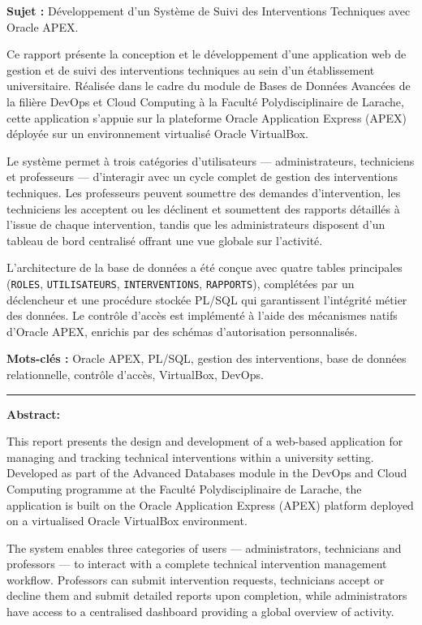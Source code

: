 \documentclass[12pt,a4paper,oneside]{report}
\begin{document}
\textbf{Sujet :} Développement d'un Système de Suivi des Interventions Techniques avec Oracle APEX.

\medskip
Ce rapport présente la conception et le développement d'une application web de gestion et de suivi des interventions techniques au sein d'un établissement universitaire. Réalisée dans le cadre du module de Bases de Données Avancées de la filière DevOps et Cloud Computing à la Faculté Polydisciplinaire de Larache, cette application s'appuie sur la plateforme Oracle Application Express (APEX) déployée sur un environnement virtualisé Oracle VirtualBox.

Le système permet à trois catégories d'utilisateurs — administrateurs, techniciens et professeurs — d'interagir avec un cycle complet de gestion des interventions techniques. Les professeurs peuvent soumettre des demandes d'intervention, les techniciens les acceptent ou les déclinent et soumettent des rapports détaillés à l'issue de chaque intervention, tandis que les administrateurs disposent d'un tableau de bord centralisé offrant une vue globale sur l'activité.

L'architecture de la base de données a été conçue avec quatre tables principales (\texttt{ROLES}, \texttt{UTILISATEURS}, \texttt{INTERVENTIONS}, \texttt{RAPPORTS}), complétées par un déclencheur et une procédure stockée PL/SQL qui garantissent l'intégrité métier des données. Le contrôle d'accès est implémenté à l'aide des mécanismes natifs d'Oracle APEX, enrichis par des schémas d'autorisation personnalisés.

\medskip
\textbf{Mots-clés :} Oracle APEX, PL/SQL, gestion des interventions, base de données relationnelle, contrôle d'accès, VirtualBox, DevOps.

\bigskip\bigskip
\rule{\linewidth}{0.4pt}
\bigskip

\textbf{Abstract:}

This report presents the design and development of a web-based application for managing and tracking technical interventions within a university setting. Developed as part of the Advanced Databases module in the DevOps and Cloud Computing programme at the Faculté Polydisciplinaire de Larache, the application is built on the Oracle Application Express (APEX) platform deployed on a virtualised Oracle VirtualBox environment.

The system enables three categories of users — administrators, technicians and professors — to interact with a complete technical intervention management workflow. Professors can submit intervention requests, technicians accept or decline them and submit detailed reports upon completion, while administrators have access to a centralised dashboard providing a global overview of activity.
\end{document}
